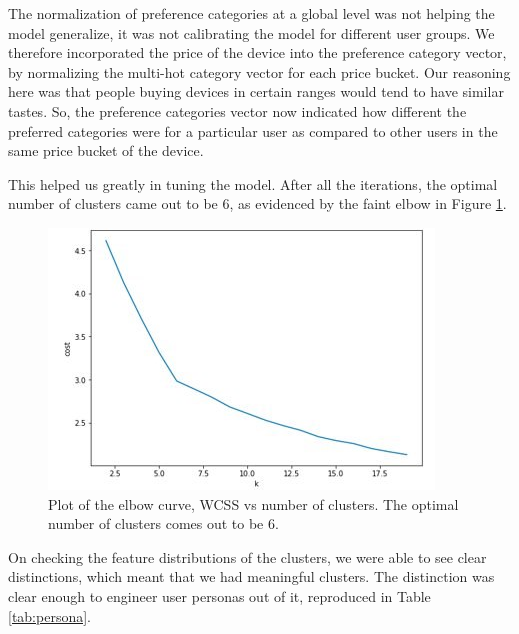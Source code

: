 The normalization of preference categories at a global level was not helping the model generalize, it was not calibrating the model for different user groups. We therefore incorporated the price of the device into the preference category vector, by normalizing the multi-hot category vector for each price bucket. Our reasoning here was that people buying devices in certain ranges would tend to have similar tastes. So, the preference categories vector now indicated how different the preferred categories were for a particular user as compared to other users in the same price bucket of the device.  

This helped us greatly in tuning the model. After all the iterations, the optimal number of clusters came out to be 6, as evidenced by the faint elbow in Figure \ref{fig:elbow}.

\begin{figure}
  \centering
  \includegraphics[width=\linewidth]{figures/elbow.jpeg}
  \caption[Elbow curve to identify optimum cluster number]{Plot of the elbow curve, WCSS vs number of clusters. The optimal number of clusters comes out to be 6.}
  \label{fig:elbow}
\end{figure}

On checking the feature distributions of the clusters, we were able to see clear distinctions, which meant that we had meaningful clusters. The distinction was clear enough to engineer user personas out of it, reproduced in Table \ref{tab:persona}.

